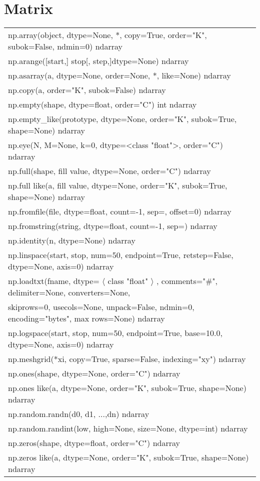 \section*{Matrix}
\hspace{1cm}
\begin{tabular}{|l|}
 	\hline
	 np.array(object, dtype=None, *, copy=True, order="K", subok=False, ndmin=0) ndarray
	 \\ np.arange([start,] stop[, step,]dtype=None) ndarray
	 \\ np.asarray(a, dtype=None, order=None, *, like=None) ndarray
	 \\ np.copy(a, order="K", subok=False) ndarray
	 \\ np.empty(shape, dtype=float, order="C") int ndarray
	 \\ np.empty\_like(prototype, dtype=None, order="K", subok=True, shape=None) ndarray
	 \\ np.eye(N, M=None, k=0, dtype=<class "float">, order="C") ndarray
	 \\ np.full(shape, fill value, dtype=None, order="C") ndarray
	 \\ np.full like(a, fill value, dtype=None, order="K", subok=True, shape=None) ndarray
	 \\ np.fromfile(file, dtype=float, count=-1, sep=, offset=0) ndarray
	 \\ np.fromstring(string, dtype=float, count=-1, sep=) ndarray
	 \\ np.identity(n, dtype=None) ndarray
	 \\ np.linspace(start, stop, num=50, endpoint=True, retstep=False, dtype=None, axis=0) ndarray
	 \\ np.loadtxt(fname, dtype= $\langle$ class "float" $\rangle$ , comments="\#", delimiter=None, converters=None,
	 \\ skiprows=0,  usecols=None, unpack=False, ndmin=0, encoding="bytes", max rows=None) ndarray
	 \\ np.logspace(start, stop, num=50, endpoint=True, base=10.0, dtype=None, axis=0) ndarray
	 \\ np.meshgrid(*xi, copy=True, sparse=False, indexing="xy") ndarray
	 \\ np.ones(shape, dtype=None, order="C") ndarray
	 \\ np.ones like(a, dtype=None, order="K", subok=True, shape=None) ndarray
	 \\ np.random.randn(d0, d1, ...,dn) ndarray
	 \\ np.random.randint(low, high=None, size=None, dtype=int) ndarray
	 \\ np.zeros(shape, dtype=float, order="C") ndarray
	 \\ np.zeros like(a, dtype=None, order="K", subok=True, shape=None) ndarray
	\\\hline
\end{tabular}
